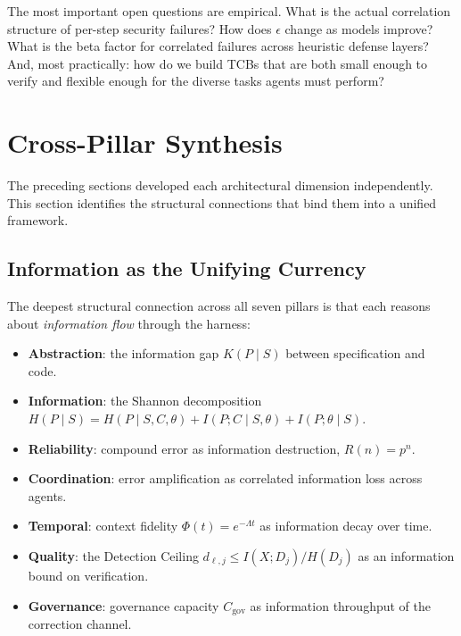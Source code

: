 \documentclass[11pt, a4paper]{googledeepmind}
\begin{document}
The most important open questions are empirical. What is the actual correlation structure of per-step security failures? How does $\epsilon$ change as models improve? What is the beta factor for correlated failures across heuristic defense layers? And, most practically: how do we build TCBs that are both small enough to verify and flexible enough for the diverse tasks agents must perform?

\section{Cross-Pillar Synthesis}
\label{sec:synthesis}

The preceding sections developed each architectural dimension independently. This section identifies the structural connections that bind them into a unified framework.

\subsection{Information as the Unifying Currency}

The deepest structural connection across all seven pillars is that each reasons about \emph{information flow} through the harness:

\begin{itemize}[nosep]
    \item \textbf{Abstraction}: the information gap $K(P \mid S)$ between specification and code.
    \item \textbf{Information}: the Shannon decomposition $H(P \mid S) = H(P \mid S,C,\theta) + I(P;C \mid S,\theta) + I(P;\theta \mid S)$.
    \item \textbf{Reliability}: compound error as information destruction, $R(n) = p^n$.
    \item \textbf{Coordination}: error amplification as correlated information loss across agents.
    \item \textbf{Temporal}: context fidelity $\Phi(t) = e^{-\Lambda t}$ as information decay over time.
    \item \textbf{Quality}: the Detection Ceiling $d_{\ell,j} \leq I(X; D_j)/H(D_j)$ as an information bound on verification.
    \item \textbf{Governance}: governance capacity $C_{\text{gov}}$ as information throughput of the correction channel.
\end{itemize}
\end{document}
